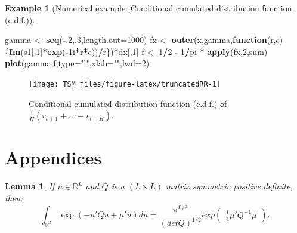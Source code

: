 \documentclass[
  12pt,
]{book}
\newenvironment{Shaded}{\begin{snugshade}}{\end{snugshade}}
\newcommand{\AttributeTok}[1]{\textcolor[rgb]{0.13,0.29,0.53}{#1}}
\newcommand{\ControlFlowTok}[1]{\textcolor[rgb]{0.13,0.29,0.53}{\textbf{#1}}}
\newcommand{\DecValTok}[1]{\textcolor[rgb]{0.00,0.00,0.81}{#1}}
\newcommand{\FunctionTok}[1]{\textcolor[rgb]{0.13,0.29,0.53}{\textbf{#1}}}
\newcommand{\NormalTok}[1]{#1}
\newcommand{\OtherTok}[1]{\textcolor[rgb]{0.56,0.35,0.01}{#1}}
\newcommand{\SpecialCharTok}[1]{\textcolor[rgb]{0.81,0.36,0.00}{\textbf{#1}}}
\newcommand{\StringTok}[1]{\textcolor[rgb]{0.31,0.60,0.02}{#1}}
\newtheorem{lemma}{Lemma}[chapter]
\theoremstyle{definition}
\theoremstyle{definition}
\newtheorem{example}{Example}[chapter]
\theoremstyle{definition}
\theoremstyle{definition}
\theoremstyle{remark}
\begin{document}
\begin{example}[Numerical example: Conditional cumulated distribution function (c.d.f.)]
\begin{Shaded}
\begin{Highlighting}[]
\NormalTok{gamma }\OtherTok{\textless{}{-}} \FunctionTok{seq}\NormalTok{(}\SpecialCharTok{{-}}\NormalTok{.}\DecValTok{2}\NormalTok{,.}\DecValTok{3}\NormalTok{,}\AttributeTok{length.out=}\DecValTok{1000}\NormalTok{)}
\NormalTok{fx }\OtherTok{\textless{}{-}} \FunctionTok{outer}\NormalTok{(x,gamma,}\ControlFlowTok{function}\NormalTok{(r,c)\{}\FunctionTok{Im}\NormalTok{(s1[,}\DecValTok{1}\NormalTok{]}\SpecialCharTok{*}\FunctionTok{exp}\NormalTok{(}\SpecialCharTok{{-}}\NormalTok{1i}\SpecialCharTok{*}\NormalTok{r}\SpecialCharTok{*}\NormalTok{c))}\SpecialCharTok{/}\NormalTok{r\})}\SpecialCharTok{*}\NormalTok{dx[,}\DecValTok{1}\NormalTok{]}
\NormalTok{f  }\OtherTok{\textless{}{-}} \DecValTok{1}\SpecialCharTok{/}\DecValTok{2} \SpecialCharTok{{-}} \DecValTok{1}\SpecialCharTok{/}\NormalTok{pi }\SpecialCharTok{*} \FunctionTok{apply}\NormalTok{(fx,}\DecValTok{2}\NormalTok{,sum)}
\FunctionTok{plot}\NormalTok{(gamma,f,}\AttributeTok{type=}\StringTok{"l"}\NormalTok{,}\AttributeTok{xlab=}\StringTok{""}\NormalTok{,}\AttributeTok{lwd=}\DecValTok{2}\NormalTok{)}
\end{Highlighting}
\end{Shaded}

\begin{figure}
\texttt{[image: TSM\_files/figure-latex/truncatedRR-1]} \caption{Conditional cumulated distribution function (c.d.f.) of $\frac{1}{H}(r_{t+1}+\dots+r_{t+H})$.}\label{fig:truncatedRR}
\end{figure}

\end{example}

\hypertarget{appendices}{%
\section{Appendices}\label{appendices}}

\begin{lemma}
\protect\hypertarget{lem:integralQuadratic}{}\label{lem:integralQuadratic}If \(\mu \in \mathbb{R}^L\) and \(Q\) is a \((L \times L)\) matrix symmetric positive definite, then:
\[
\int_{\mathbb{R}^{L}} \exp(-u'Q u + \mu'u)du =
\frac{\pi^{L/2}}{(det   Q)^{1/2}} exp \left(
\begin{array}{l}  \frac{1}{4} \mu'Q^{-1}\mu \end{array} \right).
\]
\end{lemma}
\end{document}
